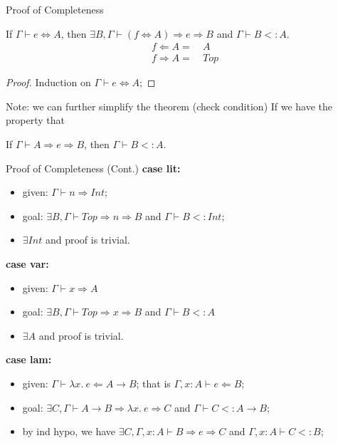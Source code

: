 
\begin{frame}{Proof of Completeness}
\begin{theorem}[Completeness]
If $\Gamma \vdash e \Leftrightarrow A$, then $\exists B, \Gamma \vdash (f \Leftrightarrow A) \Rightarrow e \Rightarrow B$ and $\Gamma \vdash B <: A$.
\begin{align*}
f \Leftarrow  A = & ~A \\
f \Rightarrow A  =& ~Top
\end{align*}
\begin{proof}
Induction on $\Gamma \vdash e \Leftrightarrow A$;
\end{proof}
\end{theorem}

Note: we can further simplify the theorem (check condition) If we have the property that
\begin{lemma}
If $\Gamma \vdash A \Rightarrow e \Rightarrow B$, then $\Gamma \vdash B <: A$.
\end{lemma}
\end{frame}

\begin{frame}{Proof of Completeness (Cont.)}
\textbf{case lit:}
\begin{itemize}
	\item given: $\Gamma \vdash n \Rightarrow Int$;
	\item goal: $\exists B, \Gamma \vdash Top \Rightarrow n \Rightarrow B$ and $\Gamma \vdash B <: Int$;
	\item $\exists Int$ and proof is trivial.
\end{itemize}
\noindent\makebox[\linewidth]{\rule{0.9\paperwidth}{0.4pt}}
\textbf{case var:}
\begin{itemize}
	\item given: $\Gamma \vdash x \Rightarrow A$
	\item goal: $\exists B, \Gamma \vdash Top \Rightarrow x \Rightarrow B$ and $\Gamma \vdash B <: A$
	\item $\exists A$ and proof is trivial.
\end{itemize}
\noindent\makebox[\linewidth]{\rule{0.9\paperwidth}{0.4pt}}
\textbf{case lam:}
\begin{itemize}
	\item given: $\Gamma \vdash \lambda x.~e \Leftarrow A \rightarrow B$; that is $\Gamma, x : A \vdash e \Leftarrow B$;
	\item goal: $\exists C, \Gamma \vdash A \rightarrow B \Rightarrow \lambda x.~e  \Rightarrow C$ and $\Gamma \vdash C <: A \rightarrow B$;
	\item by ind hypo, we have $\exists C, \Gamma, x : A \vdash B \Rightarrow e \Rightarrow C$ and $\Gamma, x : A \vdash C <: B$;
\end{itemize}
\end{frame}

